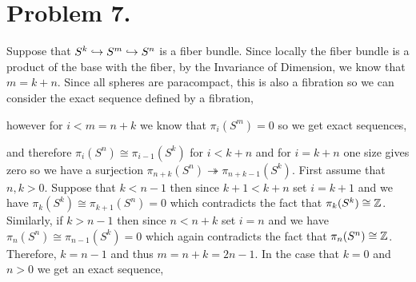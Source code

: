 \documentclass[12pt]{extarticle}
\begin{document}
\section*{Problem 7.}

Suppose that $S^k \hookrightarrow S^m \hookrightarrow S^n$ is a fiber bundle. Since locally the fiber bundle is a product of the base with the fiber, by the Invariance of Dimension, we know that $m = k + n$. Since all spheres are paracompact, this is also a fibration so we can consider the exact sequence defined by a fibration,

\begin{center}
\end{center}
however for $i < m = n + k$ we know that $\pi_i(S^m) = 0$ so we get exact sequences,
\begin{center}
\end{center}
and therefore $\pi_i(S^n) \cong \pi_{i-1}(S^k)$ for $ i < k + n$ and for $i = k + n$ one size gives zero so we have a surjection $\pi_{n + k}(S^n) \twoheadrightarrow \pi_{n + k -1}(S^k)$. First assume that $n, k > 0$. Suppose that $k < n - 1$ then since $k + 1 < k + n$ set $i = k + 1$ and we have $\pi_{k}(S^k) \cong \pi_{k+1}(S^n) = 0$ which contradicts the fact that $\pi_k(S^k) \cong \mathbb{Z}$. Similarly, if $k > n - 1$ then since $n < n + k$ set $i = n$ and we have $\pi_n(S^n) \cong \pi_{n - 1}(S^k) = 0$ which again contradicts the fact that $\pi_n(S^n) \cong \mathbb{Z}$. Therefore, $k = n - 1$ and thus $m = n + k = 2 n - 1$. In the case that $k = 0$ and $n > 0$ we get an exact sequence,
\begin{center}
\end{center}
\end{document}
